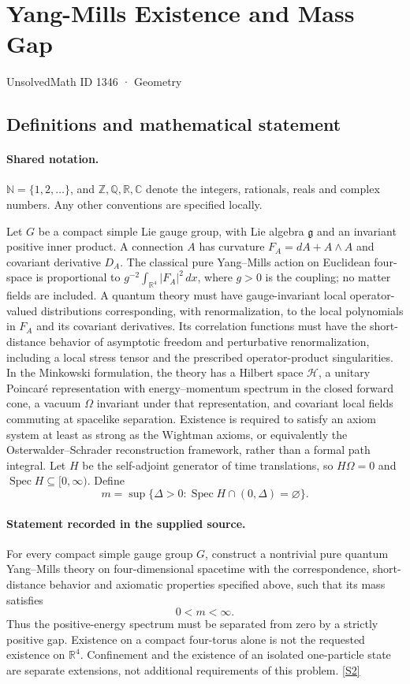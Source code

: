 \documentclass[11pt]{article}
\newcommand{\sref}[2]{\hyperlink{source:#1:#2}{[S#2]}}
\begin{document}
\setcounter{section}{1345}
\section{Yang-Mills Existence and Mass Gap}\label{1346}
{\small\sffamily UnsolvedMath ID 1346 · Geometry}
\subsection{Definitions and mathematical statement}

\paragraph{Shared notation.}$\mathbb N=\{1,2,\ldots\}$, and $\mathbb Z,\mathbb Q,\mathbb R,\mathbb C$ denote the integers, rationals, reals and complex numbers. Any other conventions are specified locally.


Let $G$ be a compact simple Lie gauge group, with Lie algebra $\mathfrak g$ and an invariant positive inner product. A connection $A$ has curvature $F_A=dA+A\wedge A$ and covariant derivative $D_A$. The classical pure Yang--Mills action on Euclidean four-space is proportional to $g^{-2}\int_{\mathbb R^4}|F_A|^2\,dx$, where $g>0$ is the coupling; no matter fields are included.
A quantum theory must have gauge-invariant local operator-valued distributions corresponding, with renormalization, to the local polynomials in $F_A$ and its covariant derivatives. Its correlation functions must have the short-distance behavior of asymptotic freedom and perturbative renormalization, including a local stress tensor and the prescribed operator-product singularities.
In the Minkowski formulation, the theory has a Hilbert space $\mathcal H$, a unitary Poincar\'e representation with energy--momentum spectrum in the closed forward cone, a vacuum $\Omega$ invariant under that representation, and covariant local fields commuting at spacelike separation. Existence is required to satisfy an axiom system at least as strong as the Wightman axioms, or equivalently the Osterwalder--Schrader reconstruction framework, rather than a formal path integral. Let $H$ be the self-adjoint generator of time translations, so $H\Omega=0$ and $\operatorname{Spec}H\subseteq[0,\infty)$. Define
\[
 m=\sup\{\Delta>0:\operatorname{Spec}H\cap(0,\Delta)=\varnothing\}.
\]
\paragraph{Statement recorded in the supplied source.}
For every compact simple gauge group $G$, construct a nontrivial pure quantum Yang--Mills theory on four-dimensional spacetime with the correspondence, short-distance behavior and axiomatic properties specified above, such that its mass satisfies
\[
 0<m<\infty.
\]
Thus the positive-energy spectrum must be separated from zero by a strictly positive gap. Existence on a compact four-torus alone is not the requested existence on $\mathbb R^4$. Confinement and the existence of an isolated one-particle state are separate extensions, not additional requirements of this problem. \sref{1346}{2}
\end{document}
